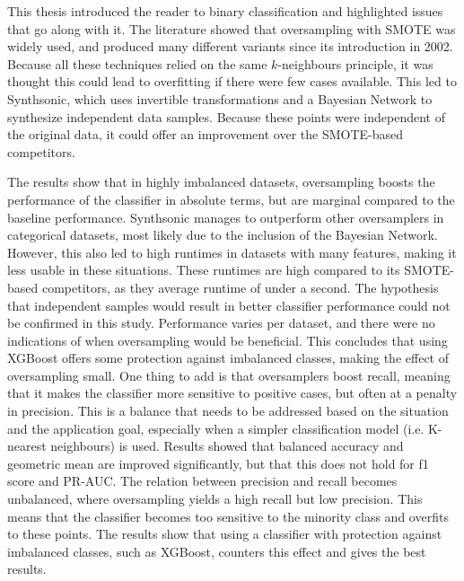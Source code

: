 This thesis introduced the reader to binary classification and highlighted issues that go along with it. The literature showed that oversampling with SMOTE was widely used, and produced many different variants since its introduction in 2002. Because all these techniques relied on the same $k$-neighbours principle, it was thought this could lead to overfitting if there were few cases available. This led to Synthsonic, which uses invertible transformations and a Bayesian Network to synthesize independent data samples. Because these points were independent of the original data, it could offer an improvement over the SMOTE-based competitors. 

The results show that in highly imbalanced datasets, oversampling boosts the performance of the classifier in absolute terms, but are marginal compared to the baseline performance. Synthsonic manages to outperform other oversamplers in categorical datasets, most likely due to the inclusion of the Bayesian Network. However, this also led to high runtimes in datasets with many features, making it less usable in these situations. These runtimes are high compared to its SMOTE-based competitors, as they average runtime of under a second. The hypothesis that independent samples would result in better classifier performance could not be confirmed in this study. Performance varies per dataset, and there were no indications of when oversampling would be beneficial. This concludes that using XGBoost offers some protection against imbalanced classes, making the effect of oversampling small. One thing to add is that oversamplers boost recall, meaning that it makes the classifier more sensitive to positive cases, but often at a penalty in precision. This is a balance that needs to be addressed based on the situation and the application goal, especially when a simpler classification model (i.e. K-nearest neighbours) is used. Results showed that balanced accuracy and geometric mean are improved significantly, but that this does not hold for f1 score and PR-AUC. The relation between precision and recall becomes unbalanced, where oversampling yields a high recall but low precision. This means that the classifier becomes too sensitive to the minority class and overfits to these points. The results show that using a classifier with protection against imbalanced classes, such as XGBoost, counters this effect and gives the best results.

